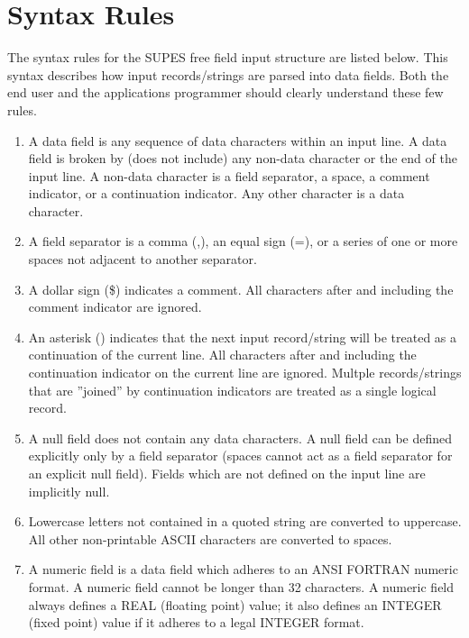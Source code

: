 \section{Syntax Rules} \label{sec:syntax}
The syntax rules for the SUPES free field input structure are listed below.
This syntax describes how input records/strings are parsed into data fields.  Both
the end user and the applications programmer should clearly understand these
few rules.
\begin{enumerate}
\item A data field is any sequence of data characters within an input line.  A
   data field is broken by (does not include) any non-data character or the
   end of the input line.  A non-data character is a field separator, a
   space, a comment indicator, or a continuation indicator.  Any other
   character is a data character.

\item A field separator is a comma (,), an equal sign (=), or a series of one
   or more spaces not adjacent to another separator.

\item A dollar sign (\$) indicates a comment.  All characters after and
   including the comment indicator are ignored.

\item An asterisk (\last) indicates that the next input record/string will be
treated as a continuation of the current line.  All characters after and
including the continuation indicator on the current line are ignored. 
Multple records/strings that are ''joined'' by continuation indicators
are treated as a single logical record.

\item A null field does not contain any data characters.  A null field can be
   defined explicitly only by a field separator (spaces cannot act as a
   field separator for an explicit null field).  Fields which are not
   defined on the input line are implicitly null.

\item \label{itm:case} Lowercase letters not contained in a quoted string
                       are converted to uppercase.  All
                       other non-printable ASCII characters are converted
                       to spaces. 

\item A numeric field is a data field which adheres to an ANSI FORTRAN numeric
   format.  A numeric field cannot be longer than 32 characters.  A numeric
   field always defines a REAL (floating point) value; it also defines an
   INTEGER (fixed point) value if it adheres to a legal INTEGER format.


\end{enumerate}
